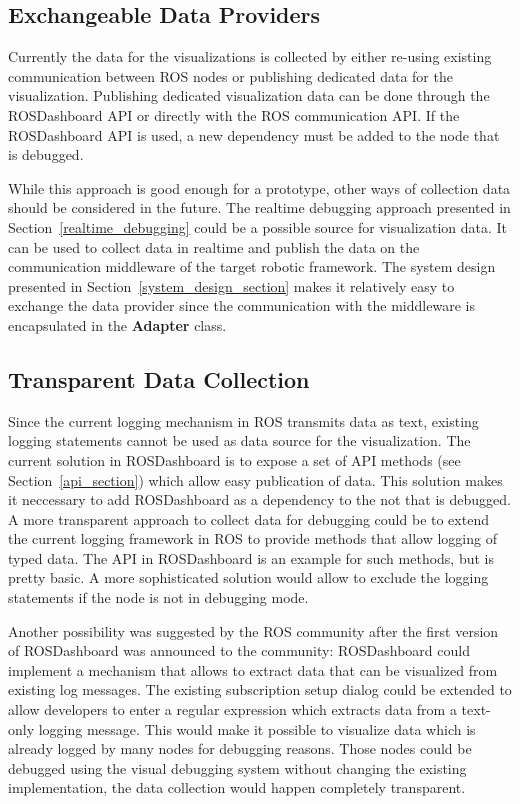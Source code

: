 \subsection{Exchangeable Data Providers}
Currently the data for the visualizations is collected by either re-using existing communication between ROS nodes or publishing dedicated data for the visualization. Publishing dedicated visualization data can be done through the ROSDashboard API or directly with the ROS communication API. If the ROSDashboard API is used, a new dependency must be added to the node that is debugged.

While this approach is good enough for a prototype, other ways of collection data should be considered in the future. The realtime debugging approach presented in Section~\ref{realtime_debugging} could be a possible source for visualization data. It can be used to collect data in realtime and publish the data on the communication middleware of the target robotic framework. The system design presented in Section~\ref{system_design_section} makes it relatively easy to exchange the data provider since the communication with the middleware is encapsulated in the \textbf{Adapter} class.

\subsection{Transparent Data Collection}
Since the current logging mechanism in ROS transmits data as text, existing logging statements cannot be used as data source for the visualization. The current solution in ROSDashboard is to expose a set of API methods (see Section~\ref{api_section}) which allow easy publication of data. This solution makes it neccessary to add ROSDashboard as a dependency to the not that is debugged. A more transparent approach to collect data for debugging could be to extend the current logging framework in ROS to provide methods that allow logging of typed data. The API in ROSDashboard is an example for such methods, but is pretty basic. A more sophisticated solution would allow to exclude the logging statements if the node is not in debugging mode.

Another possibility was suggested by the ROS community after the first version of ROSDashboard was announced to the community: ROSDashboard could implement a mechanism that allows to extract data that can be visualized from existing log messages. The existing subscription setup dialog could be extended to allow developers to enter a regular expression which extracts data from a text-only logging message. This would make it possible to visualize data which is already logged by many nodes for debugging reasons. Those nodes could be debugged using the visual debugging system without changing the existing implementation, the data collection would happen completely transparent.

